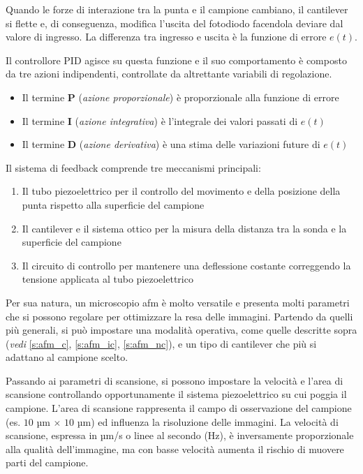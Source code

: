 \documentclass[../main.tex]{subfiles}
\begin{document}
Quando le forze di interazione tra la punta e il campione cambiano, il cantilever si flette e, di conseguenza, modifica l'uscita del fotodiodo facendola deviare dal valore di ingresso. La differenza tra ingresso e uscita è la funzione di errore $e(t)$.

Il controllore PID agisce su questa funzione e il suo comportamento è composto da tre azioni indipendenti, controllate da altrettante variabili di regolazione.\cite{ogata_2010}
\begin{itemize}
	\itemsep0em 
	\item Il termine \textbf{P} (\textit{azione proporzionale}) è proporzionale alla funzione di errore
	\item Il termine \textbf{I} (\textit{azione integrativa}) è l'integrale dei valori passati di $e(t)$
	\item Il termine \textbf{D} (\textit{azione derivativa}) è una stima delle variazioni future di $e(t)$
\end{itemize}

Il sistema di feedback comprende tre meccanismi principali: \cite{parisi}
\begin{enumerate}
	\itemsep0em 
	\item Il tubo piezoelettrico per il controllo del movimento e della posizione della punta rispetto alla superficie del campione
	\item Il cantilever e il sistema ottico per la misura della distanza tra la sonda e la superficie del campione
	\item Il circuito di controllo per mantenere una deflessione costante correggendo la tensione applicata al tubo piezoelettrico
\end{enumerate}

Per sua natura, un microscopio \acrshort{afm} è molto versatile e presenta molti parametri che si possono regolare per ottimizzare la resa delle immagini. Partendo da quelli più generali, si può impostare una modalità operativa, come quelle descritte sopra (\textit{vedi} \ref{s:afm_c}, \ref{s:afm_ic}, \ref{s:afm_nc}), e un tipo di cantilever che più si adattano al campione scelto.

Passando ai parametri di scansione, si possono impostare la velocità e l'area di scansione controllando opportunamente il sistema piezoelettrico su cui poggia il campione. L'area di scansione rappresenta il campo di osservazione del campione (es. $10$ µm $\times$ $10$ µm) ed influenza la risoluzione delle immagini. La velocità di scansione, espressa in µm/s o linee al secondo (Hz), è inversamente proporzionale alla qualità dell'immagine, ma con basse velocità aumenta il rischio di muovere parti del campione.
\end{document}

